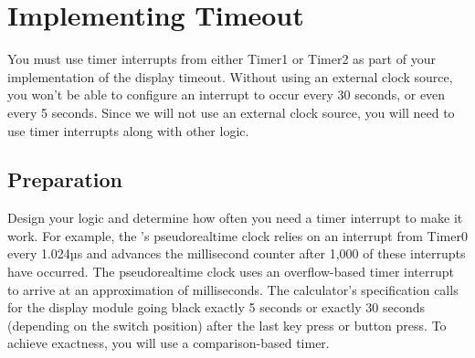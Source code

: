 \section{Implementing Timeout}\label{sec:TimerInterrupts}

You must use timer interrupts from either Timer1 or Timer2 as part of your
implementation of the display timeout. Without using an external clock source,
you won't be able to configure an interrupt to occur every 30 seconds, or even
every 5 seconds. Since we will not use an external clock source, you will need
to use timer interrupts along with other logic.

\subsection{Preparation}

Design your logic and determine how often you need a timer interrupt to make it
work. For example, the \nano's pseudorealtime clock relies on an interrupt from
Timer0 every 1.024µs and advances the millisecond counter after 1,000 of these
interrupts have occurred. The pseudorealtime clock uses an overflow-based timer
interrupt to arrive at an approximation of milliseconds. The calculator's
specification calls for the display module going black exactly 5 seconds or
exactly 30 seconds (depending on the switch position) after the last key press
or button press. To achieve exactness, you will use a comparison-based timer.

